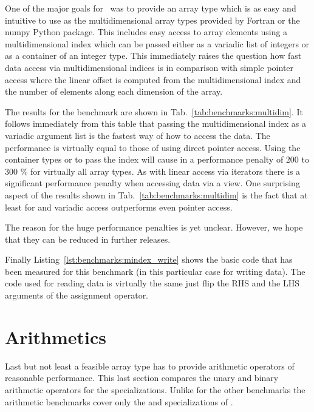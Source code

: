 One of the major goals for \libpnicore\ was to provide an array type which is as
easy and intuitive to use as the multidimensional array types provided by
Fortran or the numpy Python package. This includes easy access to array elements
using a multidimensional index which can be passed either as a variadic list of 
integers or as a container of an integer type. 
This immediately raises the question how fast data access via multidimensional 
indices is  in comparison with simple pointer access where the linear offset is
computed from the multidimensional index and the number of elements along each
dimension of the array. 

The results for the benchmark are shown in Tab.~\ref{tab:benchmarks:multidim}.
It follows immediately from this table that passing the multidimensional index
as a variadic argument list is the fastest way of how to access the data. 
The performance is virtually equal to those of using direct pointer access. 
Using the container types  or  to pass the
index will cause in a performance penalty of $200$ to $300$ \% for virtually all
array types. 
As with linear access via iterators there is a significant performance penalty
when accessing data via a view. One surprising aspect of the results shown in 
Tab.~\ref{tab:benchmarks:multidim} is the fact that at least for 
 and  variadic access outperforms even 
pointer access.

The reason for the huge performance penalties is yet unclear. However, we hope
that they can be reduced in further releases. 

Finally Listing~\ref{lst:benchmarks:mindex_write} shows the basic code that has
been measured for this benchmark (in this particular case for writing data). The
code used for reading data is virtually the same just flip the RHS and the LHS
arguments of the assignment operator.

\section{Arithmetics}

Last but not least a feasible  array type has to provide arithmetic operators 
of reasonable performance. This last section compares the unary and binary
arithmetic operators for the  specializations. 
Unlike for the other benchmarks the arithmetic benchmarks cover only the 
 and  specializations of 
.

